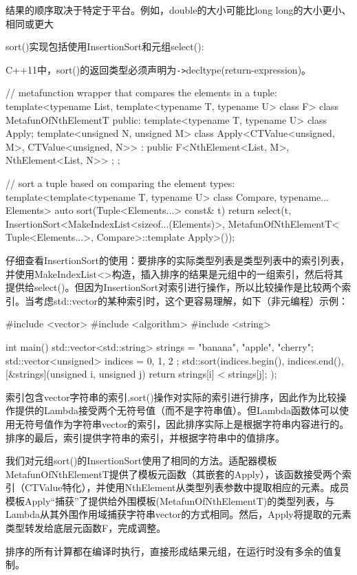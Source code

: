 \begin{notice}
结果的顺序取决于特定于平台。例如，double的大小可能比long long的大小更小、相同或更大
\end{notice}

sort()实现包括使用InsertionSort和元组select():

\begin{notice}
C++11中，sort()的返回类型必须声明为\texttt{->}decltype(return-expression)。
\end{notice}

\begin{cpp}
// metafunction wrapper that compares the elements in a tuple:
template<typename List, template<typename T, typename U> class F>
class MetafunOfNthElementT {
	public:
	template<typename T, typename U> class Apply;
	template<unsigned N, unsigned M>
	class Apply<CTValue<unsigned, M>, CTValue<unsigned, N>>
	: public F<NthElement<List, M>, NthElement<List, N>> { };
};

// sort a tuple based on comparing the element types:
template<template<typename T, typename U> class Compare,
typename... Elements>
auto sort(Tuple<Elements...> const& t)
{
	return select(t,
					InsertionSort<MakeIndexList<sizeof...(Elements)>,
									MetafunOfNthElementT<
												Tuple<Elements...>,
												Compare>::template Apply>());
}
\end{cpp}

仔细查看InsertionSort的使用：要排序的实际类型列表是类型列表中的索引列表，并使用MakeIndexList<>构造，插入排序的结果是元组中的一组索引，然后将其提供给select()。但因为InsertionSort对索引进行操作，所以比较操作是比较两个索引。当考虑std::vector的某种索引时，这个更容易理解，如下（非元编程）示例：

\begin{cpp}
#include <vector>
#include <algorithm>
#include <string>

int main()
{
	std::vector<std::string> strings = {"banana", "apple", "cherry"};
	std::vector<unsigned> indices = { 0, 1, 2 };
	std::sort(indices.begin(), indices.end(),
			[&strings](unsigned i, unsigned j) {
				return strings[i] < strings[j];
			});
}
\end{cpp}

索引包含vector字符串的索引,sort()操作对实际的索引进行排序，因此作为比较操作提供的Lambda接受两个无符号值（而不是字符串值）。但Lambda函数体可以使用无符号值作为字符串vector的索引，因此排序实际上是根据字符串内容进行的。排序的最后，索引提供字符串的索引，并根据字符串中的值排序。

我们对元组sort()的InsertionSort使用了相同的方法。适配器模板MetafunOfNthElementT提供了模板元函数（其嵌套的Apply），该函数接受两个索引（CTValue特化），并使用NthElement从类型列表参数中提取相应的元素。成员模板Apply“捕获”了提供给外围模板(MetafunOfNthElementT)的类型列表，与Lambda从其外围作用域捕获字符串vector的方式相同。然后，Apply将提取的元素类型转发给底层元函数F，完成调整。

排序的所有计算都在编译时执行，直接形成结果元组，在运行时没有多余的值复制。

















